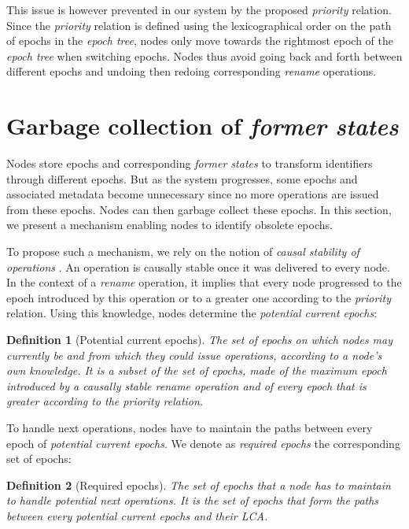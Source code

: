 \documentclass[10pt,journal,compsoc]{IEEEtran}
\newtheorem{definition}{Definition}
\begin{document}
This issue is however prevented in our system by the proposed \emph{priority} relation.
Since the \emph{priority} relation is defined using the lexicographical order on the path of epochs in the \emph{epoch tree}, nodes only move towards the rightmost epoch of the \emph{epoch tree} when switching epochs.
Nodes thus avoid going back and forth between different epochs and undoing then redoing corresponding \emph{rename} operations.

\section{Garbage collection of \emph{former states}}

\label{sec:gc-former-states}

Nodes store epochs and corresponding \emph{former states} to transform identifiers through different epochs.
But as the system progresses, some epochs and associated metadata become unnecessary since no more operations are issued from these epochs.
Nodes can then garbage collect these epochs.
In this section, we present a mechanism enabling nodes to identify obsolete epochs.

To propose such a mechanism, we rely on the notion of \emph{causal stability of operations} \cite{10.1007/978-3-662-43352-2_11}.
An operation is causally stable once it was delivered to every node.
In the context of a \emph{rename} operation, it implies that every node progressed to the epoch introduced by this operation or to a greater one according to the \emph{priority} relation.
Using this knowledge, nodes determine the \emph{potential current epochs}:

\begin{definition}[Potential current epochs]
    The set of epochs on which nodes may currently be and from which they could issue operations, according to a node's own knowledge.
    It is a subset of the set of epochs, made of the maximum epoch introduced by a causally stable \emph{rename} operation and of every epoch that is greater according to the \emph{priority} relation.
\end{definition}

To handle next operations, nodes have to maintain the paths between every epoch of \emph{potential current epochs}.
We denote as \emph{required epochs} the corresponding set of epochs:

\begin{definition}[Required epochs]
    The set of epochs that a node has to maintain to handle potential next operations.
    It is the set of epochs that form the paths between every \emph{potential current epochs} and their \ac{LCA}.
\end{definition}
\end{document}
